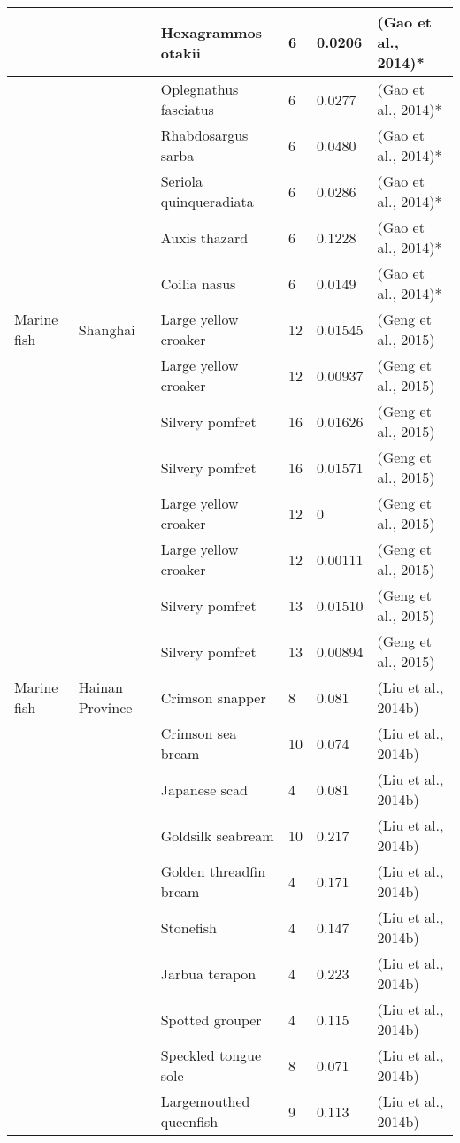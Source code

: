 \begin{center}
\begin{longtable}{ | p{2cm} | p{1.4cm} | p{3cm} | p{1.6cm} | p{1.9cm} | p{2.6cm} | }
 &  & Hexagrammos otakii & 6 & 0.0206 & (Gao et al., 2014)*  \\ \hline
 &  & Oplegnathus fasciatus & 6 & 0.0277 & (Gao et al., 2014)*  \\ \hline
 &  & Rhabdosargus sarba & 6 & 0.0480 & (Gao et al., 2014)*  \\ \hline
 &  & Seriola quinqueradiata & 6 & 0.0286 & (Gao et al., 2014)*  \\ \hline
 &  & Auxis thazard & 6 & 0.1228 & (Gao et al., 2014)*  \\ \hline
 &  & Coilia nasus & 6 & 0.0149 & (Gao et al., 2014)*  \\ \hline
Marine fish & Shanghai & Large yellow croaker  & 12 & 0.01545 & (Geng et al., 2015)  \\ \hline
 &  & Large yellow croaker  & 12 & 0.00937 & (Geng et al., 2015)  \\ \hline
 &  & Silvery pomfret  & 16 & 0.01626 & (Geng et al., 2015)  \\ \hline
 &  & Silvery pomfret  & 16 & 0.01571 & (Geng et al., 2015)  \\ \hline
 &  & Large yellow croaker  & 12 & 0 & (Geng et al., 2015)  \\ \hline
 &  & Large yellow croaker  & 12 & 0.00111 & (Geng et al., 2015)  \\ \hline
 &  & Silvery pomfret  & 13 & 0.01510 & (Geng et al., 2015)  \\ \hline
 &  & Silvery pomfret  & 13 & 0.00894 & (Geng et al., 2015)  \\ \hline
Marine fish & Hainan Province & Crimson snapper & 8 & 0.081 & (Liu et al., 2014b)  \\ \hline
 &  & Crimson sea bream & 10 & 0.074  & (Liu et al., 2014b)  \\ \hline
 &  & Japanese scad & 4 & 0.081  & (Liu et al., 2014b)  \\ \hline
 &  & Goldsilk seabream & 10 & 0.217  & (Liu et al., 2014b)  \\ \hline
 &  & Golden threadfin bream & 4 & 0.171  & (Liu et al., 2014b)  \\ \hline
 &  & Stonefish & 4 & 0.147  & (Liu et al., 2014b)  \\ \hline
 &  & Jarbua terapon & 4 & 0.223  & (Liu et al., 2014b)  \\ \hline
 &  & Spotted grouper & 4 & 0.115  & (Liu et al., 2014b)  \\ \hline
 &  & Speckled tongue sole & 8 & 0.071  & (Liu et al., 2014b)  \\ \hline
 &  & Largemouthed queenfish & 9 & 0.113  & (Liu et al., 2014b)  \\ \hline

\end{longtable}
\end{center}
